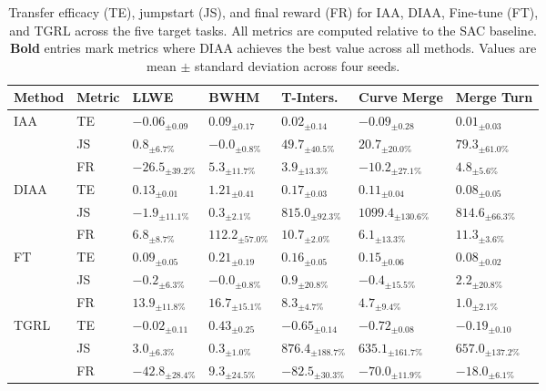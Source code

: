 \documentclass{article} %
\begin{document}
\begin{table}[t]
\centering
\begin{tabular}{lllllll}
\hline
\textbf{Method} & \textbf{Metric} & \textbf{LLWE} & \textbf{BWHM} & \textbf{T-Inters.} & \textbf{Curve Merge} & \textbf{Merge Turn} \\ \hline
\multirow{3}{*}{IAA} & TE & $-0.06_{\pm 0.09}$ & $0.09_{\pm 0.17}$ & $0.02_{\pm 0.14}$ & $-0.09_{\pm 0.28}$ & $0.01_{\pm 0.03}$ \\
 & JS & $0.8_{\pm 6.7\%}$ & $-0.0_{\pm 0.8\%}$ & $49.7_{\pm 40.5\%}$ & $20.7_{\pm 20.0\%}$ & $79.3_{\pm 61.0\%}$ \\
 & FR & $-26.5_{\pm 39.2\%}$ & $5.3_{\pm 11.7\%}$ & $3.9_{\pm 13.3\%}$ & $-10.2_{\pm 27.1\%}$ & $4.8_{\pm 5.6\%}$ \\
\hline
\multirow{3}{*}{DIAA} & TE & $\mathbf{0.13}_{\pm 0.01}$ & $\mathbf{1.21}_{\pm 0.41}$ & $\mathbf{0.17}_{\pm 0.03}$ & $0.11_{\pm 0.04}$ & $\mathbf{0.08}_{\pm 0.05}$ \\
 & JS & $-1.9_{\pm 11.1\%}$ & $\mathbf{0.3}_{\pm 2.1\%}$ & $815.0_{\pm 92.3\%}$ & $\mathbf{1099.4}_{\pm 130.6\%}$ & $\mathbf{814.6}_{\pm 66.3\%}$ \\
 & FR & $6.8_{\pm 8.7\%}$ & $\mathbf{112.2}_{\pm 57.0\%}$ & $\mathbf{10.7}_{\pm 2.0\%}$ & $\mathbf{6.1}_{\pm 13.3\%}$ & $\mathbf{11.3}_{\pm 3.6\%}$ \\
\hline
\multirow{3}{*}{FT} & TE & $0.09_{\pm 0.05}$ & $0.21_{\pm 0.19}$ & $0.16_{\pm 0.05}$ & $0.15_{\pm 0.06}$ & $0.08_{\pm 0.02}$ \\
 & JS & $-0.2_{\pm 6.3\%}$ & $-0.0_{\pm 0.8\%}$ & $0.9_{\pm 20.8\%}$ & $-0.4_{\pm 15.5\%}$ & $2.2_{\pm 20.8\%}$ \\
 & FR & $13.9_{\pm 11.8\%}$ & $16.7_{\pm 15.1\%}$ & $8.3_{\pm 4.7\%}$ & $4.7_{\pm 9.4\%}$ & $1.0_{\pm 2.1\%}$ \\
\hline
\multirow{3}{*}{TGRL} & TE & $-0.02_{\pm 0.11}$ & $0.43_{\pm 0.25}$ & $-0.65_{\pm 0.14}$ & $-0.72_{\pm 0.08}$ & $-0.19_{\pm 0.10}$ \\
 & JS & $3.0_{\pm 6.3\%}$ & $0.3_{\pm 1.0\%}$ & $876.4_{\pm 188.7\%}$ & $635.1_{\pm 161.7\%}$ & $657.0_{\pm 137.2\%}$ \\
 & FR & $-42.8_{\pm 28.4\%}$ & $9.3_{\pm 24.5\%}$ & $-82.5_{\pm 30.3\%}$ & $-70.0_{\pm 11.9\%}$ & $-18.0_{\pm 6.1\%}$ \\
\hline
\end{tabular}
\caption{Transfer efficacy (TE), jumpstart (JS), and final reward (FR) for IAA, DIAA, Fine-tune (FT), and TGRL across the five target tasks. All metrics are computed relative to the SAC baseline. \textbf{Bold} entries mark metrics where DIAA achieves the best value across all methods. Values are mean $\pm$ standard deviation across four seeds.}
\label{tbl:results}
\end{table}
\end{document}
